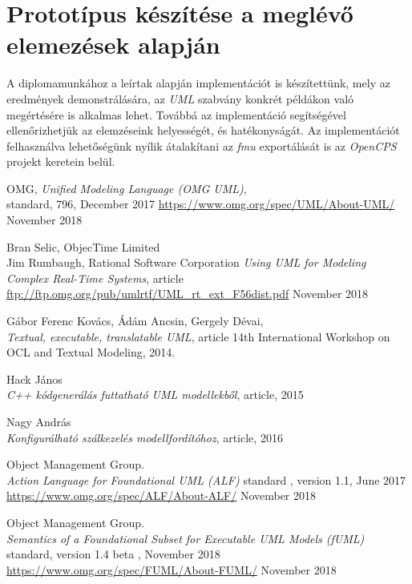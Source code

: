 \documentclass[a4paper,12pt]{report}
\begin{document}
\section{Prototípus készítése a meglévő elemezések alapján}
A diplomamunkához a leírtak alapján implementációt is készítettünk, mely az eredmények demonstrálására, az \textit{UML} szabvány konkrét példákon való megértésére is alkalmas lehet. Továbbá az implementáció segítségével ellenőrizhetjük az elemzéseink helyességét, és hatékonyságát. Az implementációt felhasználva lehetőségünk nyílik átalakítani az \textit{fmu} exportálását is az \textit{OpenCPS} projekt keretein belül.

\begin{thebibliography}{4}


	OMG, \emph{Unified Modeling Language (OMG UML)}, \\
	standard, 796, December 2017
	\url{https://www.omg.org/spec/UML/About-UML/} November 2018

	Bran Selic, ObjecTime Limited \\
	Jim Rumbaugh, Rational Software Corporation
	\emph{Using UML for Modeling Complex Real-Time Systems}, article \\
	\url{ftp://ftp.omg.org/pub/umlrtf/UML_rt_ext_F56dist.pdf} November 2018
	
  Gábor Ferenc Kovács, Ádám Ancsin, Gergely Dévai, \\
  \emph{Textual, executable, translatable UML}, article
  14th International Workshop on OCL and Textual Modeling, 
  2014. 
  
  
	Hack János \\
	\emph{C++ kódgenerálás futtatható UML modellekből}, article, 2015
	
	Nagy András \\
	\emph{Konfigurálható szálkezelés modellfordítóhoz}, article, 2016


	Object Management Group. 	\\
	\emph{Action Language for Foundational UML (ALF)}
	standard , version 1.1, June 2017\\
	\url{https://www.omg.org/spec/ALF/About-ALF/} November 2018
	
	Object Management Group. \\
	\emph{Semantics of a Foundational Subset for Executable UML Models (fUML)} 
	standard, version 1.4 beta , November 2018\\
	\url{https://www.omg.org/spec/FUML/About-FUML/} November 2018


\end{thebibliography}
\end{document}
